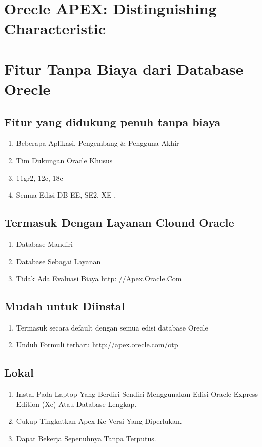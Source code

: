\documentclass{article}
\begin{document}
 \section {Orecle APEX: Distinguishing Characteristic}
 \usepackage{Pengembangan Aplikasi  IDE adalah browser web. Tidak perlu perangkat lunak klien. Aplikasi disimpan pada Database sebagai data meta. Deklaratif – didak ada pembuatan kode, Halaman efisien hanya ada 1 request dan  1 respon pemrosesan data dilakukan dalam database.}
 
 \section{Fitur Tanpa Biaya dari Database Orecle}
 \subsection{Fitur yang didukung penuh tanpa biaya}
 \begin{enumerate}
    \item Beberapa Aplikasi, Pengembang & Pengguna Akhir
    \item Tim Dukungan Oracle Khusus
    \item 11gr2, 12c, 18c
    \item Semua Edisi DB EE, SE2, XE , 
    \end{enumerate}
\subsection{Termasuk Dengan Layanan Clound Oracle}
\begin{enumerate}
    \item Database Mandiri 
    \item Database Sebagai Layanan
    \item Tidak Ada Evaluasi Biaya http: //Apex.Oracle.Com
    \end{enumerate}
\subsection{Mudah untuk Diinstal}
\begin{enumerate}
    \item Termasuk secara default dengan semua edisi database Orecle
    \item Unduh Formuli terbaru http://apex.orecle.com/otp
    \end{enumerate}
    
\subsection{Lokal}
\begin{enumerate}
    \item Instal Pada Laptop Yang Berdiri Sendiri Menggunakan Edisi Oracle Express Edition (Xe) Atau Database Lengkap.
    \item Cukup Tingkatkan Apex Ke Versi Yang Diperlukan.
    \item Dapat Bekerja Sepenuhnya Tanpa Terputus.
    \end{enumerate}
\end{document}
